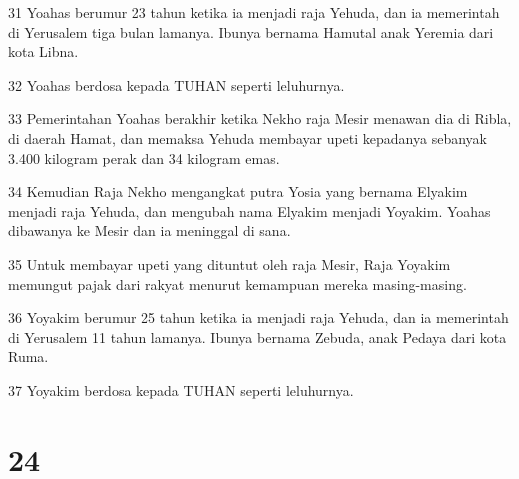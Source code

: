 \par 31 Yoahas berumur 23 tahun ketika ia menjadi raja Yehuda, dan ia memerintah di Yerusalem tiga bulan lamanya. Ibunya bernama Hamutal anak Yeremia dari kota Libna.
\par 32 Yoahas berdosa kepada TUHAN seperti leluhurnya.
\par 33 Pemerintahan Yoahas berakhir ketika Nekho raja Mesir menawan dia di Ribla, di daerah Hamat, dan memaksa Yehuda membayar upeti kepadanya sebanyak 3.400 kilogram perak dan 34 kilogram emas.
\par 34 Kemudian Raja Nekho mengangkat putra Yosia yang bernama Elyakim menjadi raja Yehuda, dan mengubah nama Elyakim menjadi Yoyakim. Yoahas dibawanya ke Mesir dan ia meninggal di sana.
\par 35 Untuk membayar upeti yang dituntut oleh raja Mesir, Raja Yoyakim memungut pajak dari rakyat menurut kemampuan mereka masing-masing.
\par 36 Yoyakim berumur 25 tahun ketika ia menjadi raja Yehuda, dan ia memerintah di Yerusalem 11 tahun lamanya. Ibunya bernama Zebuda, anak Pedaya dari kota Ruma.
\par 37 Yoyakim berdosa kepada TUHAN seperti leluhurnya.

\chapter{24}

